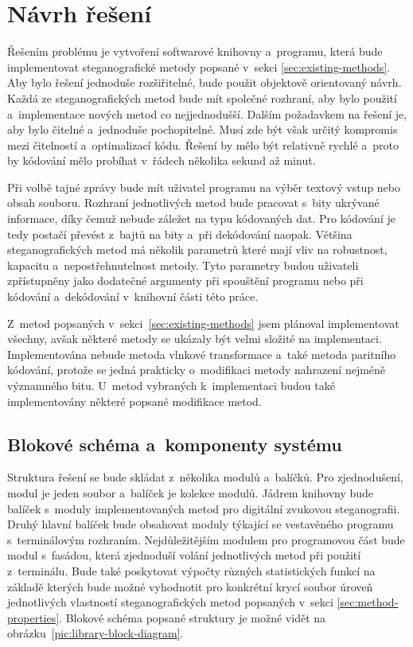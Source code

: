 \section{Návrh řešení}
\label{sec:solution-proposal}

Řešením problému je vytvoření softwarové knihovny a~programu, která bude
implementovat steganografické metody popsané v~sekci
\ref{sec:existing-methods}. Aby bylo řešení jednoduše rozšiřitelné, bude použit
objektově orientovaný návrh. Každá ze steganografických metod bude mít společné
rozhraní, aby bylo použití a~implementace nových metod co nejjednodušší. Dalším
požadavkem na řešení je, aby bylo čitelné a~jednoduše pochopitelné. Musí zde
být však určitý kompromis mezi čitelností a~optimalizací kódu. Řešení by mělo
být relativně rychlé a~proto by kódování mělo probíhat v~řádech několika sekund
až minut.

Při volbě tajné zprávy bude mít uživatel programu na výběr textový vstup nebo
obsah souboru. Rozhraní jednotlivých metod bude pracovat s~bity ukrývané
informace, díky čemuž nebude záležet na typu kódovaných dat. Pro kódování je
tedy postačí převést z~bajtů na bity a~při dekódování naopak. Většina
steganografických metod má několik parametrů které mají vliv na robustnost,
kapacitu a~nepostřehnutelnost metody. Tyto parametry budou uživateli
zpřístupněny jako dodatečné argumenty při spouštění programu nebo při kódování
a~dekódování v~knihovní části této práce.

Z~metod popsaných v~sekci~\ref{sec:existing-methods} jsem plánoval
implementovat všechny, avšak některé metody se ukázaly být velmi složité na
implementaci. Implementována nebude metoda vlnkové transformace a~také metoda
paritního kódování, protože se jedná prakticky o~modifikaci metody nahrazení
nejméně významného bitu. U~metod vybraných k~implementaci budou také
implementovány některé popsané modifikace metod.

\subsection*{Blokové schéma a~komponenty systému}
\label{sub:solution-components}

Struktura řešení se bude skládat z~několika modulů a~balíčků. Pro zjednodušení,
modul je jeden soubor a~balíček je kolekce modulů. Jádrem knihovny bude balíček
s~moduly implementovaných metod pro digitální zvukovou steganografii. Druhý
hlavní balíček bude obsahovat moduly týkající se vestavěného programu
s~terminálovým rozhraním. Nejdůležitějším modulem pro programovou část bude
modul s~fasádou, která zjednoduší volání jednotlivých metod při použití
z~terminálu. Bude také poskytovat výpočty různých statistických funkcí na
základě kterých bude možné vyhodnotit pro konkrétní krycí soubor úroveň
jednotlivých vlastností steganografických metod popsaných v~sekci
\ref{sec:method-properties}. Blokové schéma popsané struktury je možné vidět na
obrázku~\ref{pic:library-block-diagram}.


